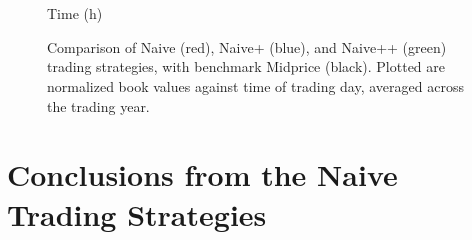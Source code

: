 \begin{figure}
\centering
\begin{subfigure}{.45\linewidth}
  \centering
  \setlength\figureheight{\linewidth} 
  \setlength\figurewidth{\linewidth}
  
\end{subfigure}%
\hfill%
\begin{subfigure}{.45\linewidth}
  \centering
  \setlength\figureheight{\linewidth} 
  \setlength\figurewidth{\linewidth}
   
\end{subfigure}\\
\vspace{1cm}
\begin{subfigure}{.45\linewidth}
  \centering
  \setlength\figureheight{\linewidth} 
  \setlength\figurewidth{\linewidth}
   
\end{subfigure}%
\hfill%
\begin{subfigure}{.45\linewidth}
  \centering
  \setlength\figureheight{\linewidth} 
  \setlength\figurewidth{\linewidth}
   
\end{subfigure}\\

\leavevmode{}\hspace{0pt plus 1filll}\null

Time (h)

\vspace{1cm}
\begin{subfigure}{\linewidth}
  \centering
   
\end{subfigure}%
  \caption{Comparison of Naive (red), Naive+ (blue), and Naive++ (green) trading strategies, with benchmark Midprice (black). Plotted are normalized book values against time of trading day, averaged across the trading year.}
  \label{fig:comp}
\end{figure}

\section{Conclusions from the Naive Trading Strategies}

